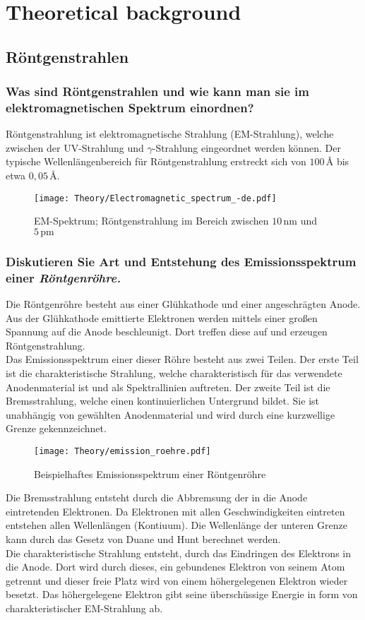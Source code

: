 \chapter{Theoretical background}
\label{chap:theory}

\section{Röntgenstrahlen}
\subsection*{Was sind Röntgenstrahlen und wie kann man sie im elektromagnetischen Spektrum einordnen?}
Röntgenstrahlung ist elektromagnetische Strahlung (EM-Strahlung), welche zwischen der UV-Strahlung und $\gamma$-Strahlung eingeordnet werden können.
Der typische Wellenlängenbereich für Röntgenstrahlung erstreckt sich von $100\,\text{\AA}$ bis etwa $0,05\,\text{\AA}$.
\begin{figure}[htb]
    \centering\texttt{[image: Theory/Electromagnetic\_spectrum\_-de.pdf]}
    \caption{EM-Spektrum; Röntgenstrahlung im Bereich zwischen $10\,\text{nm}$ und $5\,\text{pm}$ \cite{emspektrum}}
\end{figure}
\subsection*{Diskutieren Sie Art und Entstehung des Emissionsspektrum einer \textit{Röntgenröhre.}}
Die Röntgenröhre besteht aus einer Glühkathode und einer angeschrägten Anode.
Aus der Glühkathode emittierte Elektronen werden mittels einer großen Spannung auf die Anode beschleunigt.
Dort treffen diese auf und erzeugen Röntgenstrahlung.\\
Das Emissionsspektrum einer dieser Röhre besteht aus zwei Teilen.
Der erste Teil ist die charakteristische Strahlung, welche charakteristisch für das verwendete Anodenmaterial ist und als Spektrallinien auftreten.
Der zweite Teil ist die Bremsstrahlung, welche einen kontinuierlichen Untergrund bildet.
Sie ist unabhängig von gewählten Anodenmaterial und wird durch eine kurzwellige Grenze gekennzeichnet.\newpage
\begin{figure}[htb]
    \centering\texttt{[image: Theory/emission\_roehre.pdf]}
    \caption{Beispielhaftes Emissionsspektrum einer Röntgenröhre \cite{emissionsspektrum}}   
\end{figure}
Die Bremsstrahlung entsteht durch die Abbremsung der in die Anode eintretenden Elektronen.
Da Elektronen mit allen Geschwindigkeiten eintreten entstehen allen Wellenlängen (Kontiuum).
Die Wellenlänge der unteren Grenze kann durch das Gesetz von Duane und Hunt berechnet werden.\\
Die charakteristische Strahlung entsteht, durch das Eindringen des Elektrons in die Anode.
Dort wird durch dieses, ein gebundenes Elektron von seinem Atom getrennt und dieser freie Platz wird von einem höhergelegenen Elektron wieder besetzt.
Das höhergelegene Elektron gibt seine überschüssige Energie in form von charakteristischer EM-Strahlung ab. \cite{EKS}
